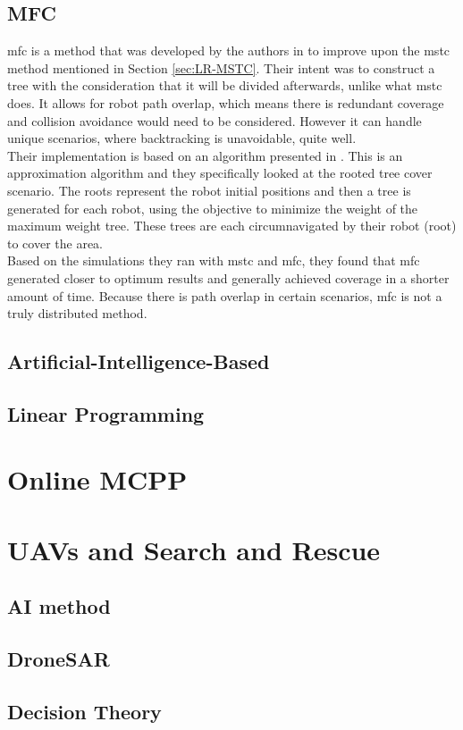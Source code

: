 \subsection{MFC}
\ac{mfc} is a method that was developed by the authors in \cite{Zheng2005} to improve upon the \ac{mstc} method mentioned in Section \ref{sec:LR-MSTC}. Their intent was to construct a tree with the consideration that it will be divided afterwards, unlike what \ac{mstc} does. It allows for robot path overlap, which means there is redundant coverage and collision avoidance would need to be considered. However it can handle unique scenarios, where backtracking is unavoidable, quite well.\\ 
Their implementation is based on an algorithm presented in \cite{Even2003}. This is an approximation algorithm and they specifically looked at the rooted tree cover scenario. The roots represent the robot initial positions and then a tree is generated for each robot, using the objective to minimize the weight of the maximum weight tree. These trees are each circumnavigated by their robot (root) to cover the area.\\
Based on the simulations they ran with \ac{mstc} and \ac{mfc}, they found that \ac{mfc} generated closer to optimum results and generally achieved coverage in a shorter amount of time.	Because there is path overlap in certain scenarios, \ac{mfc} is not a truly distributed method.
\subsection{Artificial-Intelligence-Based}
\subsection{Linear Programming}
\section{Online MCPP}
\label{sec:LR Online MCPP}
\section{UAVs and Search and Rescue}
\subsection{AI method}
\subsection{DroneSAR}
\subsection{Decision Theory}


